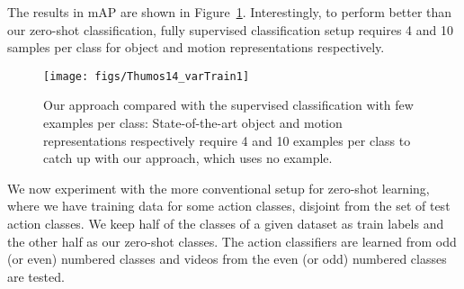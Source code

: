 The results in mAP are shown in Figure~\ref{fig:thumos_cls}.
Interestingly, to perform better than our zero-shot classification, fully supervised classification setup requires 4 and 10 samples per class for object and motion representations respectively.


\begin{figure}[t]
\centering
  \texttt{[image: figs/Thumos14\_varTrain1]}
  \caption{Our approach compared with the supervised classification with few examples per class: State-of-the-art object and motion representations respectively {require 4 and 10 examples per class} to catch up with our approach, which uses no example.}
\label{fig:thumos_cls}
\end{figure}


\begin{comment}
\begin{table*}[t]
\centering
{\small
\begin{tabular}{|l | c | c | c | c | }
\hline
{\bf Method} 		& {\bf UCF101}	&   {\bf HMDB51} &   {\bf THUMOS14}	&   {\bf UCFS}			\\	\hline
Supervised	 	&   63.9\%	&    35.1\%   	 & 54.7\%		&  60.7\%	\\	\hline				Transformed (AWV) 	&   50.0\%	&    27.9\%  	 &			&  	\\	
Transformed (FWV)	&   52.9\%	&    26.4\%  	 &			&	\\		\hline
Number of 	 	& 13320		& 5100		&  14330		& 103	\\		
training examples		&		&		&			&	\\		 \hline
\end{tabular}}
\caption{From supervised to zero-shot: . \cs{This table is not presented wisely. I am thinking a bar-graph with 3 types of dashed lines to indicate the supervised upper-bounds is better. Why emphasize this at all? We can also mention in text only.} \com{MJ: I am also not sure if this should be included, mentioning in text might be enough if we decide to keep it.}}
\label{table:superv_zero}
\end{table*}
\end{comment}


We now experiment with the more conventional setup for zero-shot learning, where we have training data for some action classes, disjoint from the set of test action classes. We keep half of the classes of a given dataset as train labels and the other half as our zero-shot classes. The action classifiers are learned from odd (or even) numbered classes and videos from the even (or odd) numbered classes are tested. 

